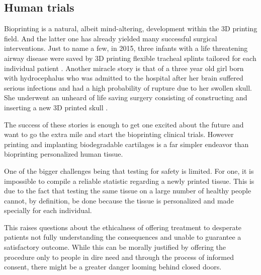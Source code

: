 \documentclass[12pt]{article} %
\begin{document}
\subsection{Human trials} %

Bioprinting is a natural, albeit mind-altering, development within the 3D printing field. And the latter one has already yielded many successful surgical interventions. Just to name a few, in 2015, three infants with a life threatening airway disease were saved by 3D printing flexible tracheal\footnotemark{} splints tailored for each individual patient \cite{Morrison:2015}.
Another miracle story is that of a three year old girl born with hydrocephalus\footnotemark{} who was admitted to the hospital after her brain suffered serious infections and had a high probability of rupture due to her swollen skull. She underwent an unheard of life saving surgery consisting of constructing and inserting a new 3D printed skull \cite{3dprint.com:2015}. 

The success of these stories is enough to get one excited about the future and want to go the extra mile and start the bioprinting clinical trials. However printing and implanting biodegradable cartilages is a far simpler endeavor than bioprinting personalized human tissue. 

One of the bigger challenges being that testing for safety is limited. For one, it is impossible to compile a reliable statistic regarding a newly printed tissue. This is due to the fact that testing the same tissue on a large number of healthy people cannot, by definition, be done because the tissue is personalized and made specially for each individual.

This raises questions about the ethicalness of offering treatment to desperate patients not fully understanding the consequences and unable to guarantee a satisfactory outcome. While this can be morally justified by offering the procedure only to people in dire need and through the process of informed consent, there might be a greater danger looming behind closed doors. 
\end{document}
